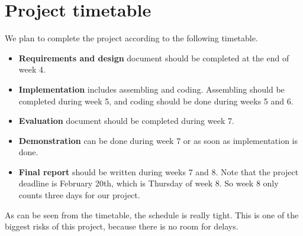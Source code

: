 \documentclass[english,11pt,twoside,a4paper]{article}
\begin{document}
\section{Project timetable}

We plan to complete the project according to the following timetable.

\begin{itemize}
  \item \textbf{Requirements and design} document should be completed at the end of week 4.
  \item \textbf{Implementation} includes assembling and coding. Assembling should be completed during week 5, and coding should be done during weeks 5 and 6.
  \item \textbf{Evaluation} document should be completed during week 7.
  \item \textbf{Demonstration} can be done during week 7 or as soon as implementation is done.
  \item \textbf{Final report} should be written during weeks 7 and 8. Note that the project deadline is February 20th, which is Thursday of week 8. So week 8 only counts three days for our project.
\end{itemize}

As can be seen from the timetable, the schedule is really tight. This is one of the biggest risks of this project, because there is no room for delays.
\end{document}
